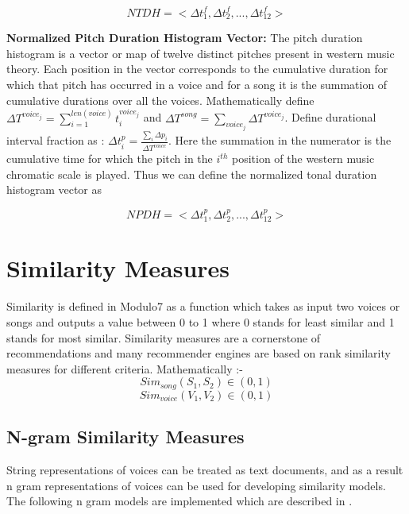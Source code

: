 \begin{equation}
NTDH = <\Delta t^f_1, \Delta t^f_2, ... , \Delta t^f_{12}>
\end{equation}

\noindent \textbf{Normalized Pitch Duration Histogram Vector:}  The pitch duration histogram is a vector or map of twelve distinct pitches present in western music theory. Each position in the vector corresponds to the cumulative duration for which that pitch has occurred in a voice and for a song it is the summation of cumulative durations over all the voices. Mathematically define $\Delta T^{voice_j} = \sum_{i=1}^{len(voice)} t_i^{voice_j}$ and $\Delta T^{song} = \sum_{voice_j} \Delta T^{voice_j}$. Define durational interval fraction as : $\Delta t^p_i = \frac{\sum_i \Delta p_i}{\Delta T^{voice}}$. Here the summation in the numerator is the cumulative time for which the pitch in the $i^{th}$ position of the western music chromatic scale is played. Thus we can define the normalized tonal duration histogram vector as 

\begin{equation} \label{NPDH}
NPDH = <\Delta t^p_1, \Delta t^p_2, ... , \Delta t^p_{12}>
\end{equation}


\section{Similarity Measures} \label{similarity}

\noindent Similarity is defined in Modulo7 as a function which takes as input two voices or songs and outputs a value between 0 to 1 where 0 stands for least similar and 1 stands for most similar. Similarity measures are a cornerstone of recommendations and many recommender engines are based on rank similarity measures for different criteria. Mathematically :-
\begin{equation}
Sim_{song}(S_1, S_2) \in (0, 1)
\end{equation}
\begin{equation}
Sim_{voice}(V_1, V_2) \in (0, 1)
\end{equation}

\subsection{N-gram Similarity Measures}

\noindent String representations of voices can be treated as text documents, and as a result n gram representations of voices can be used for developing similarity models. The following n gram models are implemented which are described in \cite{similietechnicalmanual}. \\

